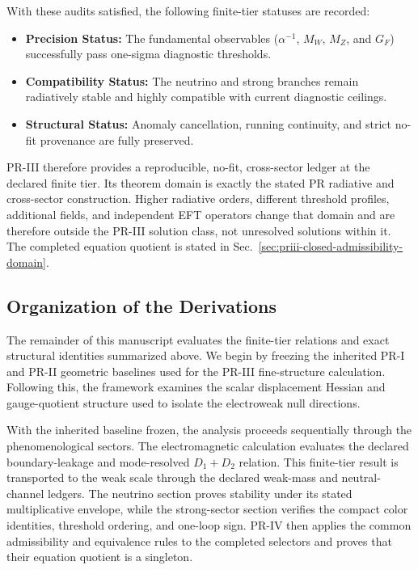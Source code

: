 \documentclass[11pt]{article}
\begin{document}
With these audits satisfied, the following finite-tier statuses are recorded:
\begin{itemize}
    \item \textbf{Precision Status:} The fundamental observables ($\alpha^{-1}$, $M_W$, $M_Z$, and $G_F$) successfully pass one-sigma diagnostic thresholds.
    \item \textbf{Compatibility Status:} The neutrino and strong branches remain radiatively stable and highly compatible with current diagnostic ceilings.
    \item \textbf{Structural Status:} Anomaly cancellation, running continuity, and strict no-fit provenance are fully preserved.
\end{itemize}

PR-III therefore provides a reproducible, no-fit, cross-sector ledger at the declared finite tier.  Its theorem domain is exactly the stated PR radiative and cross-sector construction.  Higher radiative orders, different threshold profiles, additional fields, and independent EFT operators change that domain and are therefore outside the PR-III solution class, not unresolved solutions within it.  The completed equation quotient is stated in Sec.~\ref{sec:priii-closed-admissibility-domain}.

\subsection{Organization of the Derivations}
\label{subsec:priii-remaining-sections-plan}

The remainder of this manuscript evaluates the finite-tier relations
and exact structural identities summarized above. We begin by freezing the
inherited PR-I and PR-II geometric baselines used for the PR-III fine-structure calculation. Following this, the framework examines the scalar displacement Hessian and gauge-quotient structure used to isolate the electroweak null directions.

With the inherited baseline frozen, the analysis proceeds sequentially through the phenomenological sectors.  The electromagnetic calculation evaluates the declared boundary-leakage and mode-resolved $D_1+D_2$ relation.  This finite-tier result is transported to the weak scale through the declared weak-mass and neutral-channel ledgers.  The neutrino section proves stability under its stated multiplicative envelope, while the strong-sector section verifies the compact color identities, threshold ordering, and one-loop sign.  PR-IV then applies the common admissibility and equivalence rules to the completed selectors and proves that their equation quotient is a singleton.
\end{document}
